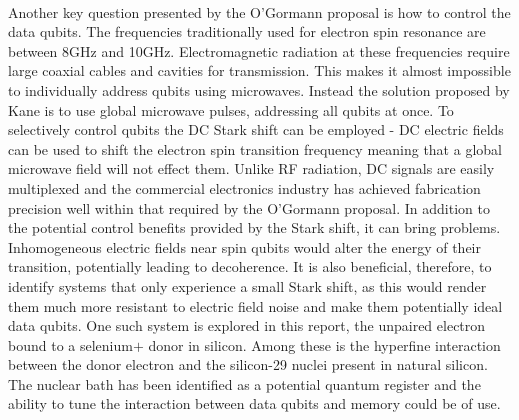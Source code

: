 \\
Another key question presented by the O'Gormann proposal is how to control the data qubits.
The frequencies traditionally used for electron spin resonance are between 8GHz and 10GHz. 
Electromagnetic radiation at these frequencies require large coaxial cables and cavities for transmission. 
This makes it almost impossible to individually address qubits using microwaves. 
Instead the solution proposed by Kane is to use global microwave pulses, addressing all qubits at once.
To selectively control qubits the DC Stark shift can be employed - DC electric fields can be used to shift the electron spin transition frequency meaning that a global microwave field will not effect them. 
Unlike RF radiation, DC signals are easily multiplexed and the commercial electronics industry has achieved fabrication precision well within that required by the O'Gormann proposal.
In addition to the potential control benefits provided by the Stark shift, it can bring problems. 
Inhomogeneous electric fields near spin qubits would alter the energy of their transition, potentially leading to decoherence.
It is also beneficial, therefore, to identify systems that only experience a small Stark shift, as this would render them much more resistant to electric field noise and make them potentially ideal data qubits.
One such system is explored in this report, the unpaired electron bound to a selenium$+$ donor in silicon.
Among these is the hyperfine interaction between the donor electron and the silicon-29 nuclei present in natural silicon.
The nuclear bath has been identified as a potential quantum register and the ability to tune the interaction between data qubits and memory could be of use. 





